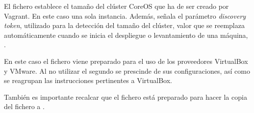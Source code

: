 El fichero  establece el tamaño del clúster CoreOS que ha de ser creado por Vagrant. En este caso una sola instancia. Además, señala el parámetro \textit{discovery token}, utilizado para la detección del tamaño del clúster, valor que se reemplaza automáticamente cuando se inicia el despliegue o levantamiento de una máquina, .

En este caso el fichero viene preparado para el uso de los proveedores VirtualBox y VMware. Al no utilizar el segundo se prescinde de sus configuraciones, así como se reagrupan las instrucciones pertinentes a VirtualBox.

También es importante recalcar que el fichero  está preparado para hacer la copia del fichero  a .

